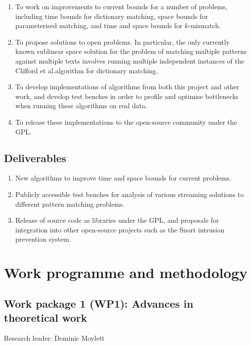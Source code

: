\documentclass[a4paper,11pt]{article}
\begin{document}
    \begin{enumerate}
        \item To work on improvements to current bounds for a number of problems, including time bounds for dictionary matching, space bounds for parameterised matching, and time and space bounds for $k$-mismatch.
        \item To propose solutions to open problems. In particular, the only currently known sublinear space solution for the problem of matching multiple patterns against multiple texts involves running multiple independent instances of the Clifford et al.\@ algorithm for dictionary matching.
        \item To develop implementations of algorithms from both this project and other work, and develop test benches in order to profile and optimise bottlenecks when running these algorithms on real data.
        \item To release these implementations to the open-source community under the GPL.
    \end{enumerate}

    \subsection{Deliverables}

    \begin{enumerate}
        \item New algorithms to improve time and space bounds for current problems.
        \item Publicly accessible test benches for analysis of various streaming solutions to different pattern matching problems.
        \item Release of source code as libraries under the GPL, and proposals for integration into other open-source projects such as the Snort intrusion prevention system.
    \end{enumerate}

    \section{Work programme and methodology}

    \subsection*{Work package 1 (WP1): Advances in theoretical work}

    Research leader: Dominic Moylett
\end{document}
